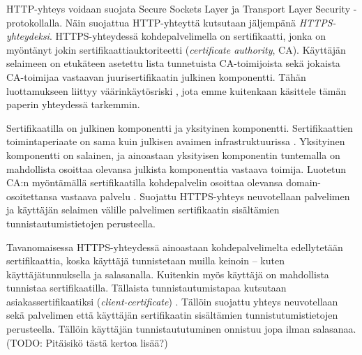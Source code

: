 \documentclass[english,gradu]{tktltiki}
\begin{document}
%

HTTP-yhteys voidaan suojata Secure Sockets Layer ja Transport Layer Security -protokollalla. Näin suojattua HTTP-yhteyttä kutsutaan jäljempänä \emph{HTTPS-yhteydeksi}. HTTPS-yhteydessä kohdepalvelimella on sertifikaatti, jonka on myöntänyt jokin sertifikaattiauktoriteetti (\emph{certificate authority}, CA). Käyttäjän selaimeen on etukäteen asetettu lista tunnetuista CA-toimijoista sekä jokaista CA-toimijaa vastaavan juurisertifikaatin julkinen komponentti. Tähän luottamukseen liittyy väärinkäytösriski \cite{certified_lies, eff_ssliverse}, jota emme kuitenkaan käsittele tämän paperin yhteydessä tarkemmin.

Sertifikaatilla on julkinen komponentti ja yksityinen komponentti.
Sertifikaattien toimintaperiaate on sama kuin julkisen avaimen infrastruktuurissa \cite{nist_pki_intro, henry_story_foaf_ssl}.
Yksityinen komponentti on salainen, ja ainoastaan yksityisen komponentin tuntemalla on mahdollista osoittaa olevansa julkista komponenttia vastaava toimija. Luotetun CA:n myöntämällä sertifikaatilla kohdepalvelin osoittaa olevansa domain-osoitettansa vastaava palvelu \cite{authenticated_names}.
Suojattu HTTPS-yhteys neuvotellaan palvelimen ja käyttäjän selaimen välille palvelimen sertifikaatin sisältämien tunnistautumistietojen perusteella.

Tavanomaisessa HTTPS-yhteydessä ainoastaan kohdepalvelimelta edellytetään sertifikaattia, koska käyttäjä tunnistetaan muilla keinoin -- kuten käyttäjätunnuksella ja salasanalla.
Kuitenkin myös käyttäjä on mahdollista tunnistaa sertifikaatilla. Tällaista tunnistautumistapaa kutsutaan asiakassertifikaatiksi (\emph{client-certificate}) \cite{henry_story_foaf_ssl}.
Tällöin suojattu yhteys neuvotellaan sekä palvelimen että käyttäjän sertifikaatin sisältämien tunnistutumistietojen perusteella.
Tällöin käyttäjän tunnistaututuminen onnistuu jopa ilman salasanaa. (TODO: Pitäisikö tästä kertoa lisää?)

\end{document}
